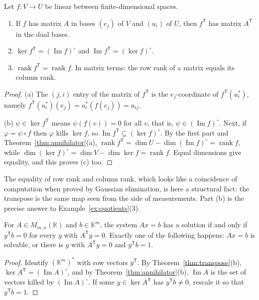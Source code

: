 \begin{theorem}\label{thm:transpose}
Let $f:V\to U$ be linear between finite-dimensional spaces.
\begin{enumerate}[label=(\alph*)]
\item If $f$ has matrix $A$ in bases $(e_j)$ of $V$ and $(u_i)$ of $U$, then $f^{\mathsf T}$ has matrix $A^{\mathsf T}$ in
the dual bases.
\item $\ker f^{\mathsf T}=(\operatorname{Im}f)^\circ$ and $\operatorname{Im}f^{\mathsf T}=(\ker f)^\circ$.
\item $\operatorname{rank}f^{\mathsf T}=\operatorname{rank}f$. In matrix terms: the row rank of a matrix equals its column
rank.
\end{enumerate}
\end{theorem}
\begin{proof}
(a) The $(j,i)$ entry of the matrix of $f^{\mathsf T}$ is the $e_j$-coordinate of $f^{\mathsf T}(u_i^*)$, namely
$f^{\mathsf T}(u_i^*)(e_j)=u_i^*(f(e_j))=a_{ij}$.

(b) $\psi\in\ker f^{\mathsf T}$ means $\psi(f(v))=0$ for all $v$, that is, $\psi\in(\operatorname{Im}f)^\circ$. Next, if
$\varphi=\psi\circ f$ then $\varphi$ kills $\ker f$, so $\operatorname{Im}f^{\mathsf T}\subseteq(\ker f)^\circ$. By the
first part and Theorem~\ref{thm:annihilator}(a),
$\operatorname{rank}f^{\mathsf T}=\dim U-\dim(\operatorname{Im}f)^\circ=\operatorname{rank}f$, while
$\dim(\ker f)^\circ=\dim V-\dim\ker f=\operatorname{rank}f$. Equal dimensions give equality, and this proves (c) too.
\end{proof}

The equality of row rank and column rank, which looks like a coincidence of computation when proved by Gaussian
elimination, is here a structural fact: the transpose is the same map seen from the side of measurements. Part (b) is the
precise answer to Example~\ref{ex:quotients}(3).

\begin{corollary}\label{cor:fredholm}
For $A\in M_{m,n}(\mathbb K)$ and $b\in\mathbb K^m$, the system $Ax=b$ has a solution if and only if $y^{\mathsf T}b=0$ for
every $y$ with $A^{\mathsf T}y=0$. Exactly one of the following happens: $Ax=b$ is solvable, or there is $y$ with
$A^{\mathsf T}y=0$ and $y^{\mathsf T}b=1$.
\end{corollary}
\begin{proof}
Identify $(\mathbb K^m)^*$ with row vectors $y^{\mathsf T}$. By Theorem~\ref{thm:transpose}(b),
$\ker A^{\mathsf T}=(\operatorname{Im}A)^\circ$, and by Theorem~\ref{thm:annihilator}(b), $\operatorname{Im}A$ is the set
of vectors killed by $(\operatorname{Im}A)^\circ$. If some $y\in\ker A^{\mathsf T}$ has $y^{\mathsf T}b\ne0$, rescale it so that
$y^{\mathsf T}b=1$.
\end{proof}

